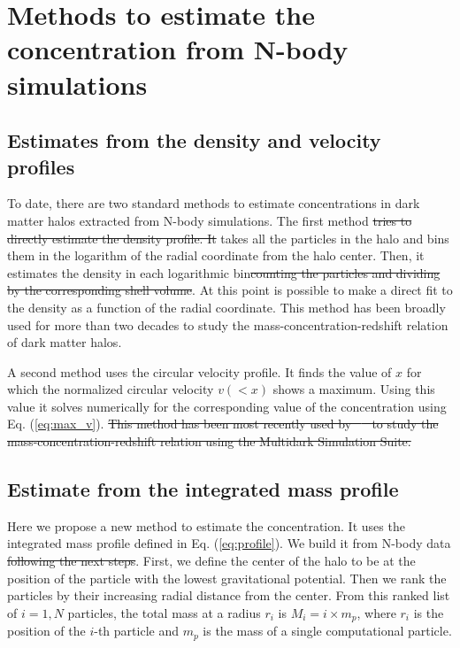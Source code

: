 \documentclass{emulateapj}
\providecommand{\DIFadd}[1]{{\protect\color{blue}\uwave{#1}}} %
\providecommand{\DIFdel}[1]{{\protect\color{red}\sout{#1}}}                      %
\providecommand{\DIFaddbegin}{} %
\providecommand{\DIFaddend}{} %
\providecommand{\DIFdelbegin}{} %
\providecommand{\DIFdelend}{} %
\begin{document}
\section{Methods to estimate the concentration from N-body simulations}
\label{sec:method}

\subsection{Estimates from the density and velocity profiles}

To date, there are two standard methods to estimate concentrations in
dark matter halos extracted from N-body simulations.  The first method
\DIFdelbegin \DIFdel{tries to directly estimate the density profile.  It }\DIFdelend takes all the particles in the halo and bins them in the logarithm of
the radial coordinate from the halo center.  Then, it estimates the
density in each logarithmic bin\DIFdelbegin \DIFdel{counting the particles and dividing by the
corresponding shell volume}\DIFdelend .  At this point is possible to make a
direct fit to the density as a function of the radial coordinate.
This method has been broadly used for more than two decades to study
the mass-concentration-redshift relation of dark matter halos. 
\DIFdelbegin %

\DIFdelend A second method uses the circular velocity profile.  It finds the
value of $x$ for which the normalized circular velocity $v(<x)$ shows
a maximum.  Using this value it solves numerically for the
corresponding value of the concentration using Eq. (\ref{eq:max_v}). 
\DIFdelbegin \DIFdel{This method has been most recently used by \mbox{%
\cite{Klypin2016}
}%
to study
the mass-concentration-redshift relation using the Multidark
Simulation Suite.
}\DIFdelend 


\subsection{Estimate from the integrated mass profile}

Here we propose a new method to estimate the concentration. 
It uses the integrated mass profile defined in
Eq. (\ref{eq:profile}).  We build it from N-body data \DIFdelbegin \DIFdel{following the
next steps}\DIFdelend \DIFaddbegin \DIFadd{as follows}\DIFaddend .
First, we define the center of the halo to be at the position of the
particle with the lowest gravitational potential. Then we rank the
particles by their increasing radial distance from the center.  From
this ranked list of $i=1,N$ particles, the total mass at a radius
$r_i$ is $M_i=i\times m_p$, where $r_i$ is the position of the $i$-th
particle and $m_p$ is the mass of a single computational particle. 
\DIFdelbegin %
\end{document}
